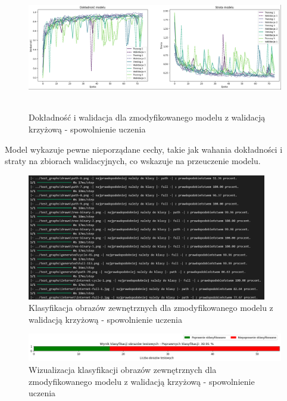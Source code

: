 \begin{figure}[ht]
	\centering
	\includegraphics[height=5.5cm]{resources/tests/images/v4/crossvalid_4_img.png}
	\caption{Dokładność i walidacja dla zmodyfikowanego modelu z walidacją krzyżową - spowolnienie uczenia}
	\label{Fig:tests-cv-4a}
\end{figure}
\FloatBarrier

Model wykazuje pewne nieporządane cechy, takie jak wahania dokładności i straty na zbiorach walidacyjnych,
co wskazuje na przeuczenie modelu.

\begin{figure}[ht]
	\centering
	\includegraphics[height=5.5cm]{resources/tests/images/v4/crossvalid_4_txt.png}
	\caption{Klasyfikacja obrazów zewnętrznych dla zmodyfikowanego modelu z walidacją krzyżową - spowolnienie uczenia}
	\label{Fig:tests-cv-4b}
\end{figure}
\FloatBarrier

\begin{figure}[ht]
	\centering
	\includegraphics[width=14cm]{resources/tests/images/v4/crossvalid_4_bar.png}
	\caption{Wizualizacja klasyfikacji obrazów zewnętrznych dla zmodyfikowanego modelu z walidacją krzyżową - spowolnienie uczenia}
	\label{Fig:tests-cv-4c}
\end{figure}
\FloatBarrier

